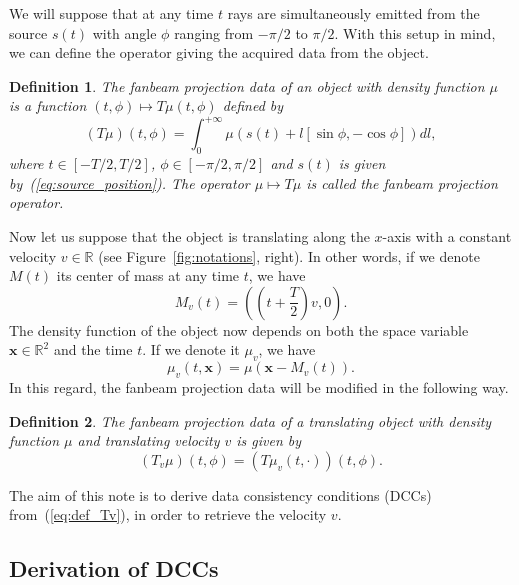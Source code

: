 \documentclass[a4paper]{article}
\numberwithin{equation}{section}
\newcommand{\R}{\mathbb{R}}
\newcommand{\bx}{\mathbf{x}}
\newtheorem{definition}{Definition}
\begin{document}
We will suppose that at any time $t$ rays are simultaneously emitted from the source $s(t)$ with angle $\phi$ ranging from $-\pi/2$ to $\pi/2$. With this setup in mind, we can define the operator giving the acquired data from the object.
\begin{definition}
The \emph{fanbeam projection data} of an object with density function $\mu$ is a function $(t,\phi) \mapsto T\mu(t,\phi)$ defined by
\begin{equation}
	(T\mu)(t,\phi) = \int_0^{+\infty} \mu \left( s(t) + l \left[ \sin \phi, -\cos \phi \right] \right) dl,
\end{equation}
where $t \in \left[ -T/2, T/2\right]$, $\phi \in \left[ -\pi/2, \pi/2\right]$ and $s(t)$ is given by~(\ref{eq:source_position}). The operator $\mu \mapsto T\mu$ is called the \emph{fanbeam projection operator}.
\end{definition}


Now let us suppose that the object is translating along the $x$-axis with a constant velocity $v \in \R$ (see Figure~\ref{fig:notations}, right). In other words, if we denote $M(t)$ its center of mass at any time $t$, we have
\begin{equation}
	M_v(t) =  \left( \left( t + \frac{T}{2} \right)v, 0 \right).
\label{eq:center_of_mass}
\end{equation}
The density function of the object now depends on both the space variable $\bx \in \R^2$ and the time $t$. If we denote it $\mu_v$, we have
\begin{equation}
	\mu_v(t,\bx) = \mu\left( \bx - M_v(t)\right).
\end{equation}
In this regard, the fanbeam projection data will be modified in the following way.
\begin{definition}
The \emph{fanbeam projection data of a translating object} with density function $\mu$ and translating velocity $v$ is given by
\begin{equation}
	(T_v\mu)(t,\phi) = \left( T \mu_v(t,\cdot) \right)(t,\phi).
\label{eq:def_Tv}
\end{equation}
\end{definition}

The aim of this note is to derive data consistency conditions (DCCs) from~(\ref{eq:def_Tv}), in order to retrieve the velocity $v$.

\subsection{Derivation of DCCs}
\end{document}
